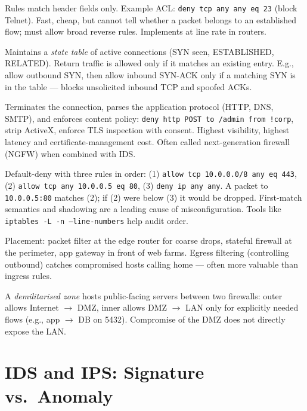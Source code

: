 \begin{description}[leftmargin=1.2em, itemsep=0.35em]
    \item[Packet filter (stateless)] Rules match header fields only. Example ACL: \texttt{deny tcp any any eq 23} (block Telnet). Fast, cheap, but cannot tell whether a packet belongs to an established flow; must allow broad reverse rules. Implements at line rate in routers.
    \item[Stateful firewall] Maintains a \emph{state table} of active connections (SYN seen, ESTABLISHED, RELATED). Return traffic is allowed only if it matches an existing entry. E.g., allow outbound SYN, then allow inbound SYN-ACK only if a matching SYN is in the table --- blocks unsolicited inbound TCP and spoofed ACKs.
    \item[Application-layer gateway / NGFW] Terminates the connection, parses the application protocol (HTTP, DNS, SMTP), and enforces content policy: \texttt{deny http POST to /admin from !corp}, strip ActiveX, enforce TLS inspection with consent. Highest visibility, highest latency and certificate-management cost. Often called next-generation firewall (NGFW) when combined with IDS.
\end{description}

\begin{example}
Default-deny with three rules in order: (1) \texttt{allow tcp 10.0.0.0/8 any eq 443}, (2) \texttt{allow tcp any 10.0.0.5 eq 80}, (3) \texttt{deny ip any any}. A packet to \texttt{10.0.0.5:80} matches (2); if (2) were below (3) it would be dropped. First-match semantics and shadowing are a leading cause of misconfiguration. Tools like \texttt{iptables -L -n --line-numbers} help audit order.
\end{example}
Placement: packet filter at the edge router for coarse drops, stateful firewall at the perimeter, app gateway in front of web farms. Egress filtering (controlling outbound) catches compromised hosts calling home --- often more valuable than ingress rules.

\begin{remark}[DMZ]
A \emph{demilitarised zone} hosts public-facing servers between two firewalls: outer allows Internet $\to$ DMZ, inner allows DMZ $\to$ LAN only for explicitly needed flows (e.g., app $\to$ DB on 5432). Compromise of the DMZ does not directly expose the LAN.
\end{remark}

\section{IDS and IPS: Signature vs.\ Anomaly}
\label{sec:ids-ips}

